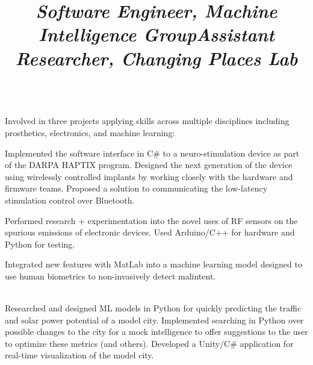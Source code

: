\documentclass[margin,line,11pt,letterpaper]{res}
\let\oldsection\section
\renewcommand{\section}[1]{\vspace{-2mm}\oldsection{\small\sc {#1}}}
\begin{document}
\begin{resume}
    \title{\textit{Software Engineer, Machine Intelligence Group}}
    \begin{position}
        \vspace{-3mm}\\
        Involved in three projects applying skills across multiple disciplines including prosthetics, electronics, and machine learning:
        \begin{list2}
            \item Implemented the software interface in C\# to a neuro-stimulation device as part of the DARPA HAPTIX program.
            Designed the next generation of the device using wirelessly controlled implants by working closely with the hardware and firmware teams. 
            Proposed a solution to communicating the low-latency stimulation control over Bluetooth.
            \item Performed research + experimentation into the novel uses of RF sensors on the spurious emissions of electronic devices.
            Used Arduino/C++ for hardware and Python for testing.
            \item Integrated new features with MatLab into a machine learning model designed to use human biometrics to non-invasively detect malintent.
        \end{list2}
    \end{position}
    
    \title{\textit{Assistant Researcher, Changing Places Lab}}
    \begin{position}
        \vspace{-3mm}\\
        Researched and designed ML models in Python for quickly predicting the traffic and solar power potential of a model city.
        Implemented searching in Python over possible changes to the city for a mock intelligence to offer suggestions to the user to optimize these metrics (and others).
        Developed a Unity/C\# application for real-time visualization of the model city.
    \end{position}
    
    \section{Projects + Competitions}
    

\end{resume}
\end{document}
